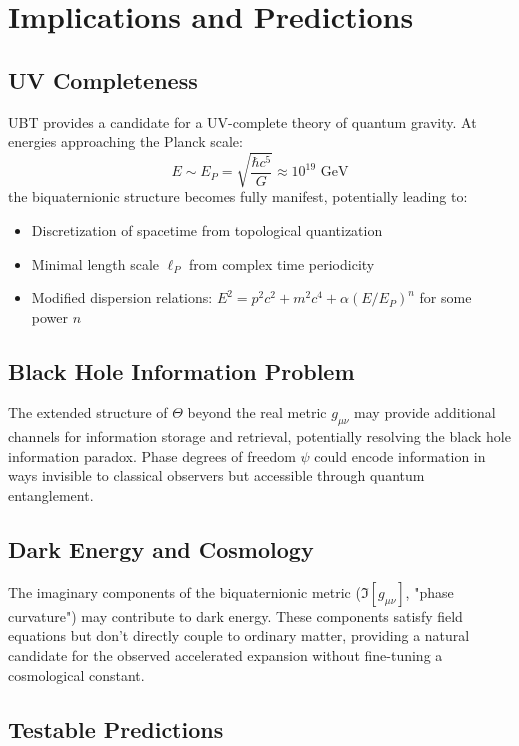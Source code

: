 \documentclass[12pt]{article}
\begin{document}
\section{Implications and Predictions}

\subsection{UV Completeness}

UBT provides a candidate for a UV-complete theory of quantum gravity. At energies approaching the Planck scale:
\begin{equation}
    E \sim E_P = \sqrt{\frac{\hbar c^5}{G}} \approx 10^{19} \text{ GeV}
\end{equation}
the biquaternionic structure becomes fully manifest, potentially leading to:
\begin{itemize}
    \item Discretization of spacetime from topological quantization
    \item Minimal length scale $\ell_P$ from complex time periodicity
    \item Modified dispersion relations: $E^2 = p^2c^2 + m^2c^4 + \alpha (E/E_P)^n$ for some power $n$
\end{itemize}

\subsection{Black Hole Information Problem}

The extended structure of $\Theta$ beyond the real metric $g_{\mu\nu}$ may provide additional channels for information storage and retrieval, potentially resolving the black hole information paradox. Phase degrees of freedom $\psi$ could encode information in ways invisible to classical observers but accessible through quantum entanglement.

\subsection{Dark Energy and Cosmology}

The imaginary components of the biquaternionic metric ($\Im[g_{\mu\nu}]$, "phase curvature") may contribute to dark energy. These components satisfy field equations but don't directly couple to ordinary matter, providing a natural candidate for the observed accelerated expansion without fine-tuning a cosmological constant.

\subsection{Testable Predictions}
\end{document}
